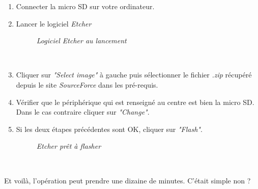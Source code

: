 \begin{enumerate}
	\item Connecter la micro SD sur votre ordinateur.\\
	\item Lancer le logiciel \textit{Etcher}\\
	\begin{figure}[H]
	\begin{center}
	\end{center}
		\caption{ \textit{Logiciel Etcher au lancement}}
	\end{figure}\\
	\item Cliquer sur \textit{"Select image"} à gauche puis sélectionner le fichier \textit{.zip} récupéré depuis le site \textit{SourceForce} dans les pré-requis.\\
	\item Vérifier que le périphérique qui est renseigné au centre est bien la micro SD. Dans le cas contraire cliquer sur \textit{"Change"}.\\
	\item Si les deux étapes précédentes sont OK, cliquer sur \textit{"Flash"}.\\
	\begin{figure}[H]
	\begin{center}
	\end{center}
		\caption{ \textit{Etcher prêt à flasher}}
	\end{figure}\\
\end{enumerate}
Et voilà, l'opération peut prendre une dizaine de minutes. C'était simple non ?

